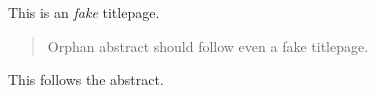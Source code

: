 \documentclass{report}
\begin{document}
\begin{center}
\huge
This is an \emph{fake} titlepage.
\end{center}

\begin{abstract}
Orphan abstract should follow even a fake titlepage.
\end{abstract}

This follows the abstract.
\end{document}
